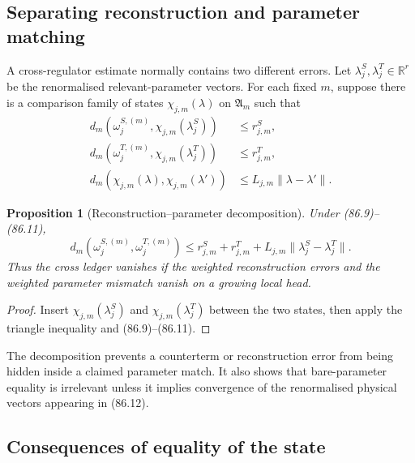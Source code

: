 \documentclass[11pt]{article}
\newtheorem{proposition}[theorem]{Proposition}
\theoremstyle{remark}
\begin{document}
\subsection{Separating reconstruction and parameter matching}

A cross-regulator estimate normally contains two different errors.
Let \(\lambda_j^S,\lambda_j^T\in\mathbb R^r\) be the renormalised
relevant-parameter vectors.  For each fixed \(m\), suppose there is a
comparison family of states
\(\chi_{j,m}(\lambda)\) on \({\mathfrak A}_m\) such that
\begin{align}
 d_m(\omega_j^{S,(m)},\chi_{j,m}(\lambda_j^S))
 &\leq r_{j,m}^S,                                           \tag{86.9}\\
 d_m(\omega_j^{T,(m)},\chi_{j,m}(\lambda_j^T))
 &\leq r_{j,m}^T,                                           \tag{86.10}\\
 d_m(\chi_{j,m}(\lambda),\chi_{j,m}(\lambda'))
 &\leq L_{j,m}\|\lambda-\lambda'\|.                         \tag{86.11}
\end{align}

\begin{proposition}[Reconstruction--parameter decomposition]
\label{prop:v12v86-parameters}
Under (86.9)--(86.11),
\begin{equation}
 d_m(\omega_j^{S,(m)},\omega_j^{T,(m)})
 \leq
 r_{j,m}^S+r_{j,m}^T
 +L_{j,m}\|\lambda_j^S-\lambda_j^T\|.                       \tag{86.12}
\end{equation}
Thus the cross ledger vanishes if the weighted reconstruction errors
and the weighted parameter mismatch vanish on a growing local head.
\end{proposition}

\begin{proof}
Insert
\(\chi_{j,m}(\lambda_j^S)\) and
\(\chi_{j,m}(\lambda_j^T)\) between the two states, then apply the
triangle inequality and (86.9)--(86.11).
\end{proof}

The decomposition prevents a counterterm or reconstruction error
from being hidden inside a claimed parameter match.  It also shows
that bare-parameter equality is irrelevant unless it implies
convergence of the renormalised physical vectors appearing in
(86.12).

\subsection{Consequences of equality of the state}
\end{document}
